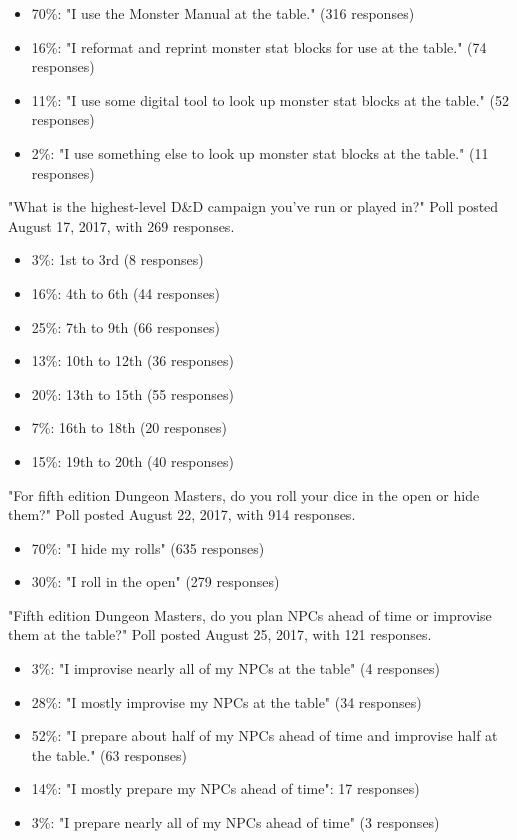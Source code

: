 \documentclass[10pt,a4paper,twoside,bg=print,twocolumn,openany,nodeprecatedcode]{dndbook}
\begin{document}
\begin{itemize}
\item 70\%: "I use the Monster Manual at the table." (316 responses)
\item 16\%: "I reformat and reprint monster stat blocks for use at the table." (74 responses)
\item 11\%: "I use some digital tool to look up monster stat blocks at the table." (52 responses)
\item 2\%: "I use something else to look up monster stat blocks at the table." (11 responses)
\end{itemize}

"What is the highest-level D\&D campaign you've run or played in?"
Poll posted August 17, 2017, with 269 responses.

\begin{itemize}
\item 3\%: 1st to 3rd (8 responses)
\item 16\%: 4th to 6th (44 responses)
\item 25\%: 7th to 9th (66 responses)
\item 13\%: 10th to 12th (36 responses)
\item 20\%: 13th to 15th (55 responses)
\item 7\%: 16th to 18th (20 responses)
\item 15\%: 19th to 20th (40 responses)
\end{itemize}

"For fifth edition Dungeon Masters, do you roll your dice in the open or hide them?"
Poll posted August 22, 2017, with 914 responses.

\begin{itemize}
\item 70\%: "I hide my rolls" (635 responses)
\item 30\%: "I roll in the open" (279 responses)
\end{itemize}

"Fifth edition Dungeon Masters, do you plan NPCs ahead of time or improvise them at the table?"
Poll posted August 25, 2017, with 121 responses.

\begin{itemize}
\item 3\%: "I improvise nearly all of my NPCs at the table" (4 responses)
\item 28\%: "I mostly improvise my NPCs at the table" (34 responses)
\item 52\%: "I prepare about half of my NPCs ahead of time and improvise half at the table." (63 responses)
\item 14\%: "I mostly prepare my NPCs ahead of time": 17 responses)
\item 3\%: "I prepare nearly all of my NPCs ahead of time" (3 responses)
\end{itemize}
\end{document}
